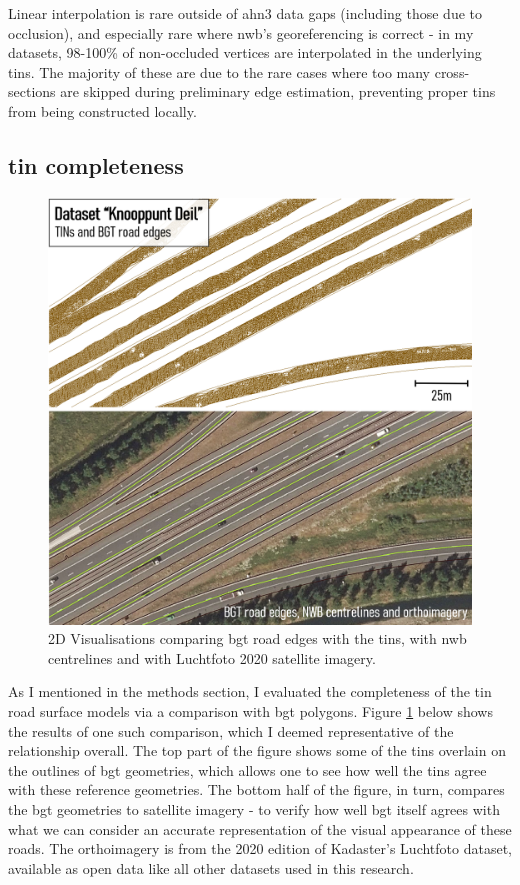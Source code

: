Linear interpolation is rare outside of \ac{ahn3} data gaps (including those due to occlusion), and especially rare where \ac{nwb}'s georeferencing is correct - in my datasets, 98-100\% of non-occluded vertices are interpolated in the underlying \ac{tin}s. The majority of these are due to the rare cases where too many cross-sections are skipped during preliminary edge estimation, preventing proper \ac{tin}s from being constructed locally.

\subsection{\ac{tin} completeness}
\label{sub:tincompleteness}

\begin{figure}
    \centering
    \includegraphics[width=0.8\linewidth]{final_report/figs/bgtcomparison.png}
    \caption{2D Visualisations comparing \ac{bgt} road edges with the \ac{tin}s, with \ac{nwb} centrelines and with Luchtfoto 2020 satellite imagery.}
    \label{fig:bgtcomparison}
\end{figure}

As I mentioned in the methods section, I evaluated the completeness of the \ac{tin} road surface models via a comparison with \ac{bgt} polygons. Figure \ref{fig:bgtcomparison} below shows the results of one such comparison, which I deemed representative of the relationship overall. The top part of the figure shows some of the \ac{tin}s overlain on the outlines of \ac{bgt} geometries, which allows one to see how well the \ac{tin}s agree with these reference geometries. The bottom half of the figure, in turn, compares the \ac{bgt} geometries to satellite imagery - to verify how well \ac{bgt} itself agrees with what we can consider an accurate representation of the visual appearance of these roads. The orthoimagery is from the 2020 edition of Kadaster's Luchtfoto dataset, available as open data like all other datasets used in this research.

